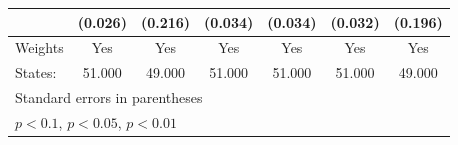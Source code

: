 {\begin{tabular}{l*{6}{c}}
            &     (0.026)         &     (0.216)         &     (0.034)         &     (0.034)         &     (0.032)         &     (0.196)         \\
\hline
Weights     &         Yes         &         Yes         &         Yes         &         Yes         &         Yes         &         Yes         \\
States:     &      51.000         &      49.000         &      51.000         &      51.000         &      51.000         &      49.000         \\
\hline\hline
\multicolumn{7}{l}{\footnotesize Standard errors in parentheses}\\
\multicolumn{7}{l}{\footnotesize \sym{*} \(p<0.1\), \sym{**} \(p<0.05\), \sym{***} \(p<0.01\)}\\
\end{tabular}
}
